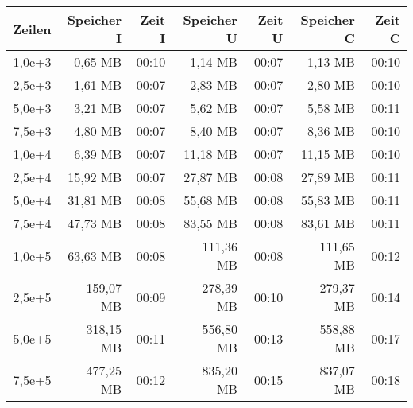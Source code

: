 \begin{table}
    \centering
    \begin{tabular}{|r|r|r|r|r|r|r|}
        \hline
        \textbf{Zeilen} & \textbf{Speicher I} & \textbf{Zeit I} & \textbf{Speicher U} & \textbf{Zeit U} & \textbf{Speicher C} & \textbf{Zeit C} \\ \hline
        1,0e+3          & 0,65 MB             & 00:10           & 1,14 MB             & 00:07           & 1,13 MB             & 00:10           \\ \hline
        2,5e+3          & 1,61 MB             & 00:07           & 2,83 MB             & 00:07           & 2,80 MB             & 00:10           \\ \hline
        5,0e+3          & 3,21 MB             & 00:07           & 5,62 MB             & 00:07           & 5,58 MB             & 00:11           \\ \hline
        7,5e+3          & 4,80 MB             & 00:07           & 8,40 MB             & 00:07           & 8,36 MB             & 00:10           \\ \hline
        1,0e+4          & 6,39 MB             & 00:07           & 11,18 MB            & 00:07           & 11,15 MB            & 00:10           \\ \hline
        2,5e+4          & 15,92 MB            & 00:07           & 27,87 MB            & 00:08           & 27,89 MB            & 00:11           \\ \hline
        5,0e+4          & 31,81 MB            & 00:08           & 55,68 MB            & 00:08           & 55,83 MB            & 00:11           \\ \hline
        7,5e+4          & 47,73 MB            & 00:08           & 83,55 MB            & 00:08           & 83,61 MB            & 00:11           \\ \hline
        1,0e+5          & 63,63 MB            & 00:08           & 111,36 MB           & 00:08           & 111,65 MB           & 00:12           \\ \hline
        2,5e+5          & 159,07 MB           & 00:09           & 278,39 MB           & 00:10           & 279,37 MB           & 00:14           \\ \hline
        5,0e+5          & 318,15 MB           & 00:11           & 556,80 MB           & 00:13           & 558,88 MB           & 00:17           \\ \hline
        7,5e+5          & 477,25 MB           & 00:12           & 835,20 MB           & 00:15           & 837,07 MB           & 00:18           \\ \hline

\end{tabular}
\end{table}
